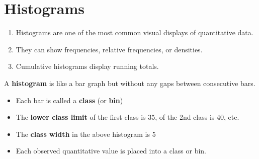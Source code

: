 \documentclass{article}
\begin{document}
\section*{Histograms}

\begin{tcolorbox}[colframe=orange!70!white, coltitle=black, title=\textbf{Summary}]
\begin{enumerate}
    \item Histograms are one of the most common visual displays of quantitative data.
    \item They can show frequencies, relative frequencies, or densities.
    \item Cumulative histograms display running totals.
\end{enumerate}
\end{tcolorbox}
\vspace{0.75in}

A {\color{blue}\textbf{histogram}} is like a bar graph but without any gaps between consecutive bars.

\begin{center}
\end{center}

\begin{itemize}
    \item Each bar is called a {\color{blue}\textbf{class}} (or {\color{blue}\textbf{bin}})
    \item The {\color{violet}\textbf{lower class limit}} of the first class is 35, of the 2nd class is 40, etc.
    \item The {\color{red}\textbf{class width}} in the above histogram is 5
    \item Each observed quantitative value is placed into a class or bin.
\end{itemize}

\vfill 
\end{document}
